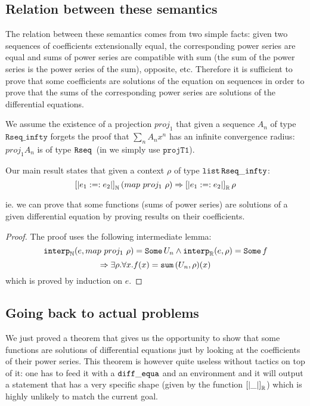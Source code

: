 \documentclass{article}
\begin{document}
\subsection{Relation between these semantics}

The relation between these semantics comes from two simple facts: given two
sequences of coefficients extensionally equal, the corresponding power
series are equal and sums of power series are compatible with sum (the sum
of the power series is the power series of the sum), opposite, etc.
Therefore it is sufficient to prove that some coefficients are solutions of
the equation on sequences in order to prove that the sums of the corresponding
power series are solutions of the differential equations.


We assume the existence of a projection $proj_1$ that given a sequence $A_n$ of
type $\mathtt{Rseq\_infty}$ forgets the proof that $\sum_n A_n x^n$ has an
infinite convergence radius: $proj_1 A_n$ is of type $\operatorname{\mathtt{Rseq}}{}$ (in \coq{} we
simply use $\mathtt{projT1}$).

\begin{theorem}Our main result states that given a context
$\rho$ of type $\operatorname{\mathtt{list}}{} \mathtt{Rseq\_infty}$:
$$\left[\left| e_1 :=: e_2 \right|\right]_{\mathbb{N}} (map ~ proj_1 ~ \rho) \Rightarrow
\left[\left| e_1 :=: e_2 \right|\right]_{\mathbb{R}} \rho$$

ie. we can prove that some functions (sums of power series) are solutions
of a given differential equation by proving results on their coefficients.
\end{theorem}

\begin{proof} The proof uses the following intermediate lemma:
$$\operatorname{\operatorname{\mathtt{interp}}_{\mathbb{N}}}(e, map ~ proj_1 ~ \rho) = \operatorname{\mathtt{Some}} U_n \wedge \operatorname{\operatorname{\mathtt{interp}}_{\mathbb{R}}}(e, \rho) = \operatorname{\mathtt{Some}} f$$
$$\Rightarrow \exists \rho. \forall x. f(x) = \operatorname{\mathtt{sum}}{}(U_n, \rho)(x)$$
which is proved by induction on $e$.
\end{proof}

\subsection{Going back to actual problems}

We just proved a theorem that gives us the opportunity to show that some functions
are solutions of differential equations just by looking at the coefficients of
their power series. This theorem is however quite useless without tactics on top
of it: one has to feed it with a $\operatorname{\mathtt{diff\_equa}}$ and an environment and it will output a
statement that has a very specific shape (given by the function $\left[\left|
 \_ \right|\right]_{\mathbb{R}}$) which is highly unlikely to match the current goal.
\end{document}

